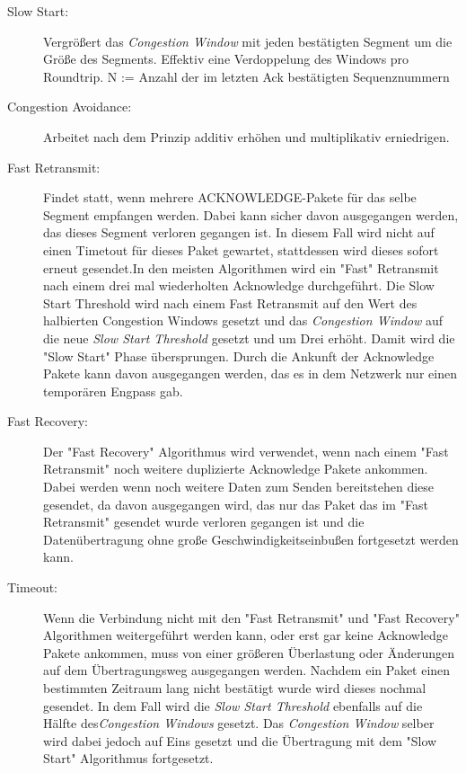 \begin{description}
\item[Slow Start: ] Vergrößert das \textit{Congestion Window} mit jeden bestätigten Segment um die Größe des Segments. Effektiv eine Verdoppelung des Windows pro Roundtrip.
N := Anzahl der im letzten Ack bestätigten Sequenznummern
\item[Congestion Avoidance:] Arbeitet nach dem Prinzip additiv erhöhen und multiplikativ erniedrigen. 
\item[Fast Retransmit:] Findet statt, wenn mehrere ACKNOWLEDGE-Pakete für das selbe Segment empfangen werden. Dabei kann sicher davon ausgegangen werden, das dieses Segment verloren gegangen ist. In diesem Fall wird nicht auf einen Timetout für dieses Paket gewartet, stattdessen wird dieses sofort erneut gesendet.In den meisten Algorithmen wird ein {}"Fast"{} Retransmit nach einem drei mal wiederholten Acknowledge durchgeführt. Die Slow Start Threshold wird nach einem Fast Retransmit auf den Wert des halbierten Congestion Windows gesetzt und das \textit{Congestion Window} auf die neue \textit{Slow Start Threshold} gesetzt und um Drei erhöht. Damit wird die {}"Slow Start"{} Phase übersprungen. Durch die Ankunft der Acknowledge Pakete kann davon ausgegangen werden, das es in dem Netzwerk nur einen temporären Engpass gab. 
\item[Fast Recovery:] Der {}"Fast Recovery"{} Algorithmus wird verwendet, wenn nach einem {}"Fast Retransmit"{} noch weitere duplizierte Acknowledge Pakete ankommen. Dabei werden wenn noch weitere Daten zum Senden bereitstehen diese gesendet, da davon ausgegangen wird, das nur das Paket das im {}"Fast Retransmit"{} gesendet wurde verloren gegangen ist und die Datenübertragung ohne große Geschwindigkeitseinbußen fortgesetzt werden kann. 

\item[Timeout:] Wenn die Verbindung nicht mit den {}"Fast Retransmit{}" und {}"Fast Recovery{}" Algorithmen weitergeführt werden kann, oder erst gar keine Acknowledge Pakete ankommen, muss von einer größeren Überlastung oder Änderungen auf dem Übertragungsweg ausgegangen werden. Nachdem ein Paket einen bestimmten Zeitraum lang nicht bestätigt wurde wird dieses nochmal gesendet. In dem Fall wird die \textit{Slow Start Threshold} ebenfalls auf die Hälfte des\textit{Congestion Windows} gesetzt. Das \textit{Congestion Window} selber wird dabei jedoch auf Eins gesetzt und die Übertragung mit dem {}"Slow Start{}" Algorithmus fortgesetzt. 
\end{description}

